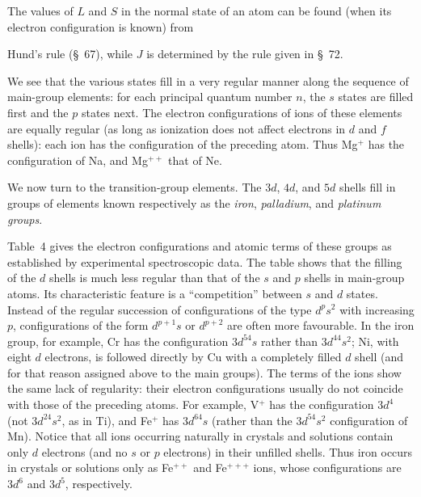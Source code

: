 The values of $L$ and $S$ in the normal state of an atom can be found (when its electron configuration is known) from

Hund's rule (\S~67), while $J$ is determined by the rule given in \S~72.



We see that the various states fill in a very regular manner along the sequence of main-group elements: for each principal quantum number $n$, the $s$ states are filled first and the $p$ states next. The electron configurations of ions of these elements are equally regular (as long as ionization does not affect electrons in $d$ and $f$ shells): each ion has the configuration of the preceding atom. Thus Mg$^+$ has the configuration of Na, and Mg$^{++}$ that of Ne.

We now turn to the transition-group elements. The $3d$, $4d$, and $5d$ shells fill in groups of elements known respectively as the \emph{iron}, \emph{palladium}, and \emph{platinum groups}.

Table~4 gives the electron configurations and atomic terms of these groups as established by experimental spectroscopic data. The table shows that the filling of the $d$ shells is much less regular than that of the $s$ and $p$ shells in main-group atoms. Its characteristic feature is a ``competition'' between $s$ and $d$ states. Instead of the regular succession of configurations of the type $d^ps^2$ with increasing $p$, configurations of the form $d^{p+1}s$ or $d^{p+2}$ are often more favourable. In the iron group, for example, Cr has the configuration $3d^54s$ rather than $3d^44s^2$; Ni, with eight $d$ electrons, is followed directly by Cu with a completely filled $d$ shell (and for that reason assigned above to the main groups). The terms of the ions show the same lack of regularity: their electron configurations usually do not coincide with those of the preceding atoms. For example, V$^+$ has the configuration $3d^4$ (not $3d^24s^2$, as in Ti), and Fe$^+$ has $3d^64s$ (rather than the $3d^54s^2$ configuration of Mn). Notice that all ions occurring naturally in crystals and solutions contain only $d$ electrons (and no $s$ or $p$ electrons) in their unfilled shells. Thus iron occurs in crystals or solutions only as Fe$^{++}$ and Fe$^{+++}$ ions, whose configurations are $3d^6$ and $3d^5$, respectively.

